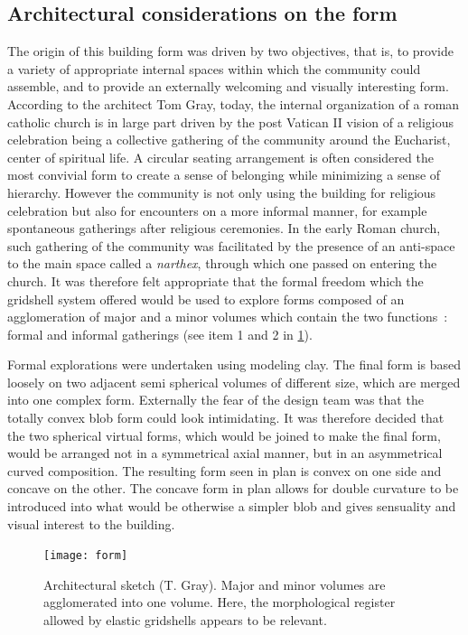 \subsection{Architectural considerations on the form}
The origin of this building form was driven by two objectives, that is, to provide a variety of appropriate internal spaces within which the community could assemble, and to provide an externally welcoming and visually interesting form. According to the architect Tom Gray, today, the internal organization of a roman catholic church is in large part driven by the post Vatican II vision of a religious celebration being a collective gathering of the community around the Eucharist, center of spiritual life. A circular seating arrangement is often considered the most convivial form to create a sense of belonging while minimizing a sense of hierarchy. However the community is not only using the building for religious celebration but also for encounters on a more informal manner, for example spontaneous gatherings after religious ceremonies. In the early Roman church, such gathering of the community was facilitated by the presence of an anti-space to the main space called a \emph{narthex}, through which one passed on entering the church. It was therefore felt appropriate that the formal freedom which the gridshell system offered would be used to explore forms composed of an agglomeration of major and a minor volumes which contain the two functions~: formal and informal gatherings (see item 1 and 2 in \cref{fig:form}).

Formal explorations were undertaken using modeling clay. The final form is based loosely on two adjacent semi spherical volumes of different size, which are merged into one complex form. Externally the fear of the design team was that the totally convex blob form could look intimidating. It was therefore decided that the two spherical virtual forms, which would be joined to make the final form, would be arranged not in a symmetrical axial manner, but in an asymmetrical curved composition. The resulting form seen in plan is convex on one side and concave on the other. The concave form in plan allows for double curvature to be introduced into what would be otherwise a simpler blob and gives sensuality and visual interest to the building.

\begin{figure}[t]
	\centering
		\texttt{[image: form]}
		\caption[Architectural sketch]{Architectural sketch (T. Gray). Major and minor volumes are agglomerated into one volume. Here, the morphological register allowed by elastic gridshells appears to be relevant.}\label{fig:form}    
\end{figure}

